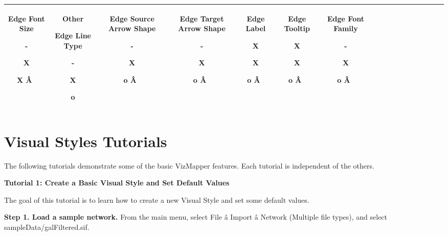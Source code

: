 \begin{tabular}{|c|c|c|c|c|c|c|c|c|c|c|c|c|c|c|c|c|}
 Edge Font Size 


 - 


 X 


 X 
\^A  &

 Other 


  Edge Line Type 


  - 


 X 


 o 
 &

  Edge Source Arrow Shape 


  - 


  X 


  o 
\^A  &

  Edge Target Arrow Shape 


  - 


 X 


 o 
\^A  &

  Edge Label 


  X 


  X 


 o 
\^A  &

  Edge Tooltip 


  X 


  X 


 o 
\^A  &

  Edge Font Family 


  - 


 X 


 o 
\^A  \\
 \hline 

\end{tabular}



 
\section*{Visual Styles Tutorials}


 The following tutorials demonstrate some of the basic VizMapper features. Each tutorial is independent of the others. 


 \textbf{Tutorial 1: Create a Basic Visual Style and Set Default Values}


 The goal of this tutorial is to learn how to create a new Visual Style and set some default values. 


 \textbf{Step 1. Load a sample network.}
 From the main menu, select File \^a Import \^a Network (Multiple file types), and select sampleData/galFiltered.sif. 


